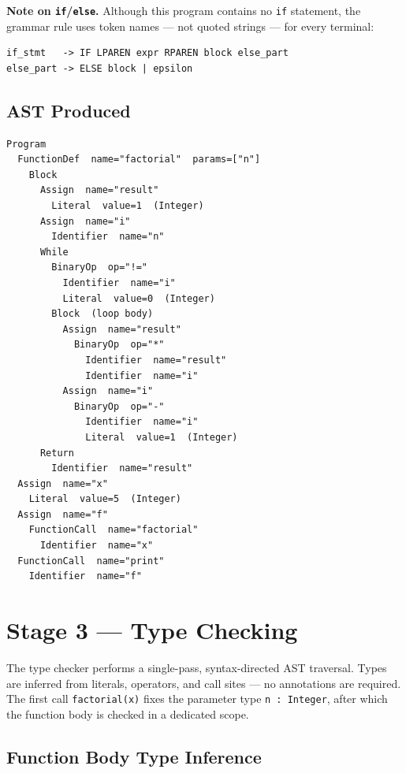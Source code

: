 \documentclass[11pt,a4paper]{article}
\begin{document}
\noindent\textbf{Note on \texttt{if}/\texttt{else}.}
Although this program contains no \texttt{if} statement, the grammar rule
uses token names --- not quoted strings --- for every terminal:
\begin{lstlisting}[language={},numbers=none,frame=none,backgroundcolor=\color{white}]
if_stmt   -> IF LPAREN expr RPAREN block else_part
else_part -> ELSE block | epsilon
\end{lstlisting}

\subsection*{AST Produced}

\begin{lstlisting}[language={},numbers=none,frame=none,
  backgroundcolor=\color{white},
  caption={Abstract Syntax Tree for the factorial program.}]
Program
  FunctionDef  name="factorial"  params=["n"]
    Block
      Assign  name="result"
        Literal  value=1  (Integer)
      Assign  name="i"
        Identifier  name="n"
      While
        BinaryOp  op="!="
          Identifier  name="i"
          Literal  value=0  (Integer)
        Block  (loop body)
          Assign  name="result"
            BinaryOp  op="*"
              Identifier  name="result"
              Identifier  name="i"
          Assign  name="i"
            BinaryOp  op="-"
              Identifier  name="i"
              Literal  value=1  (Integer)
      Return
        Identifier  name="result"
  Assign  name="x"
    Literal  value=5  (Integer)
  Assign  name="f"
    FunctionCall  name="factorial"
      Identifier  name="x"
  FunctionCall  name="print"
    Identifier  name="f"
\end{lstlisting}

\section{Stage 3 --- Type Checking}

The type checker performs a single-pass, syntax-directed AST traversal.
Types are inferred from literals, operators, and call sites --- no
annotations are required.  The first call \texttt{factorial(x)} fixes the
parameter type \texttt{n : Integer}, after which the function body is
checked in a dedicated scope.

\subsection*{Function Body Type Inference}
\end{document}
